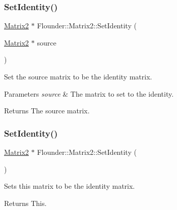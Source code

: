 \subsubsection{\texorpdfstring{Set\+Identity()}{SetIdentity()}\hspace{0.1cm}{\footnotesize\ttfamily [1/2]}}
{\footnotesize\ttfamily \hyperlink{class_flounder_1_1_matrix2}{Matrix2} $\ast$ Flounder\+::\+Matrix2\+::\+Set\+Identity (\begin{DoxyParamCaption}\item[{\hyperlink{class_flounder_1_1_matrix2}{Matrix2} $\ast$}]{source }\end{DoxyParamCaption})\hspace{0.3cm}{\ttfamily [static]}}



Set the source matrix to be the identity matrix. 


\begin{DoxyParams}{Parameters}
{\em source} & The matrix to set to the identity. \\
\hline
\end{DoxyParams}
\begin{DoxyReturn}{Returns}
The source matrix. 
\end{DoxyReturn}
\mbox{\label{class_flounder_1_1_matrix2_a394f10b0955184bf77cbf42561679ddb}} 
\subsubsection{\texorpdfstring{Set\+Identity()}{SetIdentity()}\hspace{0.1cm}{\footnotesize\ttfamily [2/2]}}
{\footnotesize\ttfamily \hyperlink{class_flounder_1_1_matrix2}{Matrix2} $\ast$ Flounder\+::\+Matrix2\+::\+Set\+Identity (\begin{DoxyParamCaption}{ }\end{DoxyParamCaption})}



Sets this matrix to be the identity matrix. 

\begin{DoxyReturn}{Returns}
This. 
\end{DoxyReturn}
\mbox{\label{class_flounder_1_1_matrix2_a0f5b40d999508bb6466de9fd689d252a}} 
